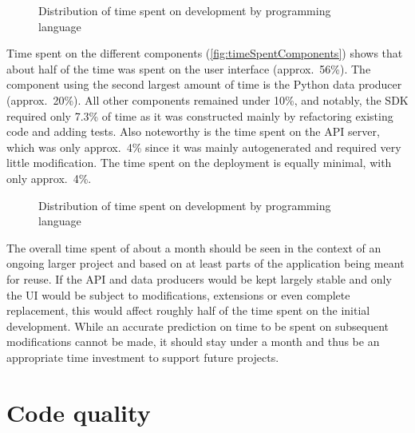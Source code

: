\begin{figure*}[!ht]
\centering
\hfill
\caption[Distribution of time spent on development]{Distribution of time spent on development by programming language\protect}
\label{fig:timeSpentLanguages}
\end{figure*}

Time spent on the different components (\autoref{fig:timeSpentComponents}) shows that about half of the time was spent on the user interface (approx.~56\%). The component using the second largest amount of time is the Python data producer (approx.~20\%).
All other components remained under 10\%, and notably, the \ac{SDK} required only 7.3\% of time as it was constructed mainly by refactoring existing code and adding tests.
Also noteworthy is the time spent on the \ac{API} server, which was only approx.~4\% since it was mainly autogenerated and required very little modification.
The time spent on the deployment is equally minimal, with only approx.~4\%.

\begin{figure*}[!ht]
\centering
\hfill
\caption[Distribution of time spent on development]{Distribution of time spent on development by programming language\protect}
\label{fig:timeSpentComponents}
\end{figure*}

The overall time spent of about a month should be seen in the context of an ongoing larger project and based on at least parts of the application being meant for reuse.
If the \ac{API} and data producers would be kept largely stable and only the \ac{UI} would be subject to modifications, extensions or even complete replacement, this would affect roughly half of the time spent on the initial development.
While an accurate prediction on time to be spent on subsequent modifications cannot be made, it should stay under a month and thus be an appropriate time investment to support future projects.

\section{Code quality}
\label{sec:code-quality}


